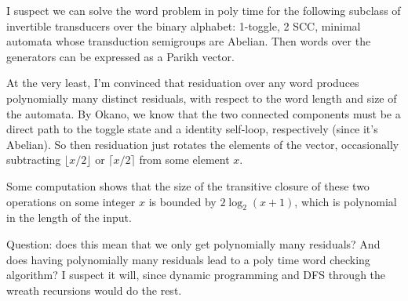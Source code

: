 \documentclass[11pt]{article}
\title{\concourse{Notes on the complexity of the word problem for semigroups over invertible transducers}}
\author{\concourse{Evan Bergeron}}
\date{\concourse{\today}}
\theoremstyle{pleasant}
\newcommand{\0}{\underline{0}}
\newcommand{\1}{\underline{1}}
\newcommand{\2}{\underline{2}}
\begin{document}
\maketitle

I suspect we can solve the word problem in poly time for the following subclass of invertible transducers over the binary alphabet: 1-toggle, 2 SCC, minimal automata whose transduction semigroups are Abelian. Then words over the generators can be expressed as a Parikh vector.

At the very least, I'm convinced that residuation over any word produces polynomially many distinct residuals, with respect to the word length and size of the automata. By Okano, we know that the two connected components must be a direct path to the toggle state and a identity self-loop, respectively (since it's Abelian). So then residuation just rotates the elements of the vector, occasionally subtracting $\lfloor x/2 \rfloor$ or $\lceil x/2 \rceil$ from some element $x$.

Some computation shows that the size of the transitive closure of these two operations on some integer $x$ is bounded by $2\log_2(x+1)$, which is polynomial in the length of the input.

Question: does this mean that we only get polynomially many residuals? And does having polynomially many residuals lead to a poly time word checking algorithm? I suspect it will, since dynamic programming and DFS through the wreath recursions would do the rest.
\end{document}
